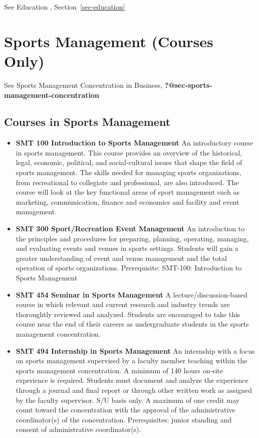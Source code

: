 \documentclass[
  letterpaper,
]{scrbook}
\providecommand{\tightlist}{%
  \setlength{\itemsep}{0pt}\setlength{\parskip}{0pt}}
\begin{document}
See Education , Section~\ref{sec-education}

\section{Sports Management (Courses
Only)}\label{sports-management-courses-only}

See Sports Management Concentration in Business,
\textbf{?@sec-sports-management-concentration}

\subsection{Courses in Sports
Management}\label{courses-in-sports-management}

\begin{itemize}
\tightlist
\item
  \textbf{SMT 100 Introduction to Sports Management} An introductory
  course in sports management. This course provides an overview of the
  historical, legal, economic, political, and social-cultural issues
  that shape the field of sports management. The skills needed for
  managing sports organizations, from recreational to collegiate and
  professional, are also introduced. The course will look at the key
  functional areas of sport management such as marketing, communication,
  finance and economics and facility and event management.\\
\item
  \textbf{SMT 300 Sport/Recreation Event Management} An introduction to
  the principles and procedures for preparing, planning, operating,
  managing, and evaluating events and venues in sports settings.
  Students will gain a greater understanding of event and venue
  management and the total operation of sports organizations.
  Prerequisite: SMT-100: Introduction to Sports Management
\item
  \textbf{SMT 454 Seminar in Sports Management} A
  lecture/discussion-based course in which relevant and current research
  and industry trends are thoroughtly reviewed and analyzed. Students
  are encouraged to take this course near the end of their careers as
  undergraduate students in the sports management concentration.
\item
  \textbf{SMT 494 Internship in Sports Management} An internship with a
  focus on sports management supervised by a faculty member teaching
  within the sports management concentration. A minimum of 140 hours
  on-site experience is required. Students must document and analyze the
  experience through a journal and final report or through other written
  work as assigned by the faculty supervisor. S/U basis only. A maximum
  of one credit may count toward the concentration with the approval of
  the administrative coordinator(s) of the concentration. Prerequisites:
  junior standing and consent of administrative coordinator(s).
\end{itemize}
\end{document}
